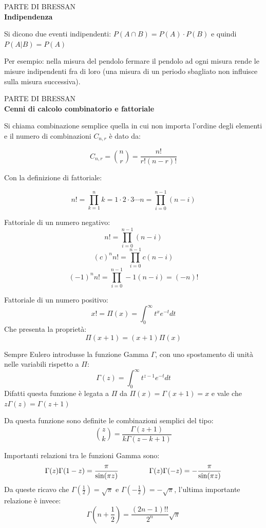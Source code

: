 \documentclass[openany,a4paper,12pt]{book}
\theoremstyle{remark}
\newcommand{\ripasso}[1]{
    \vspace{2em}\noindent %
    \begin{tcolorbox}[
        enhanced,
        boxrule=0pt,                  %
        frame hidden,                 %
        colback=red!5!white,          %
        borderline west={4pt}{0pt}{red!85!black}, %
        sharp corners,                %
        top=8pt, bottom=8pt, left=12pt, %
        width=\textwidth,
        before skip=0pt, after skip=1.5em %
    ]
        {\small\sffamily\color{red!85!black}\MakeUppercase{Parte di Bressan}}\\[4pt]
        {\Large\bfseries\color{black!85} #1}
    \end{tcolorbox}
    \noindent\ignorespaces %
}
\begin{document}
\ripasso{Indipendenza}
Si dicono due eventi indipendenti: $P(A \cap B)=P(A) \cdot P(B)$ e quindi $P(A|B)=P(A)$ 

Per esempio: nella misura del pendolo fermare il pendolo ad ogni misura rende le misure indipendenti fra di loro (una misura di un periodo sbagliato non influisce sulla misura successiva).

\ripasso{Cenni di calcolo combinatorio e fattoriale}
Si chiama combinazione semplice quella in cui non importa l'ordine degli elementi e il numero di combinazioni $C_{n,r}$ è dato da:

\[
C_{n,r} = \binom{n}{r} = \frac{n!}{r!(n - r)!}
\]

Con la definizione di fattoriale:

\[
n! = \prod_{k=1}^{n} k = 1 \cdot 2 \cdot 3 \cdots n = \prod_{i=0}^{n-1} (n - i)
\]

Fattoriale di un numero negativo:
\[
n!=\prod_{i=0}^{n-1}(n-i)
\]
\[
{(c)}^n n!=\prod_{i=0}^{n-1}c(n-i)
\]
\[
{(-1)}^n n!=\prod_{i=0}^{n-1}-1(n-i)=(-n)!
\]

Fattoriale di un numero positivo:
\[
x! = \Pi(x)=\int_{0}^{\infty}t^{x}e^{-t}dt
\]
Che presenta la proprietà:
\[
\Pi(x+1)=(x+1)\Pi(x)
\]

Sempre Eulero introdusse la funzione Gamma $\Gamma$, con uno spostamento di unità nelle variabili rispetto a $\Pi$:
\[
\Gamma(z)=\int_{0}^{\infty}t^{z-1}e^{-t}dt
\]
Difatti questa funzione è legata a $\Pi$ da $\Pi(x)=\Gamma(x+1)=x\!$ e vale che $z\Gamma(z)=\Gamma(z+1)$

Da questa funzione sono definite le combinazioni semplici del tipo:
\[
\binom{z}{k}=\frac{\Gamma(z+1)}{k\! \Gamma(z-k+1)}
\]

Importanti relazioni tra le funzioni Gamma sono:
\[
\Gamma(z)\Gamma(1-z)=\frac{\pi}{\sin(\pi z)} \hspace{1.5cm} \Gamma(z)\Gamma(-z)=-\frac{\pi}{\sin(\pi z)}
\]
Da queste ricavo che $\Gamma(\frac{1}{2})=\sqrt{\pi}$ e $\Gamma(-\frac{1}{2})=-\sqrt{\pi}$, l'ultima importante relazione è invece:
\[
\Gamma(n+\frac{1}{2})=\frac{(2n-1)!!}{2^n}\sqrt{\pi}
\]
\end{document}
